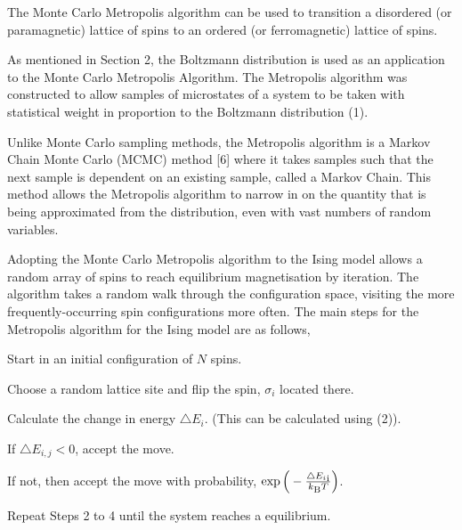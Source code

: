\documentclass[a4paper]{article}
\begin{document}
The Monte Carlo Metropolis algorithm \cite{5} can be used to transition a disordered (or paramagnetic) lattice of spins to an ordered (or ferromagnetic) lattice of spins.

As mentioned in Section 2, the Boltzmann distribution is used as an application to the Monte Carlo Metropolis Algorithm. The Metropolis algorithm was constructed to allow samples of microstates of a system to be taken with statistical weight in proportion to the Boltzmann distribution (1). 

Unlike Monte Carlo sampling methods, the Metropolis algorithm is a Markov Chain Monte Carlo (MCMC) method [6] where it takes samples such that the next sample is dependent on an existing sample, called a Markov Chain. This method allows the Metropolis algorithm to narrow in on the quantity that is being approximated from the distribution, even with vast numbers of random variables. 


Adopting the Monte Carlo Metropolis algorithm to the Ising model \cite{6} allows a random array of spins to reach equilibrium magnetisation by iteration. The algorithm takes a random walk through the configuration space, visiting the more frequently-occurring spin configurations more often. The main steps for the Metropolis algorithm for the Ising model \cite{6} are as follows, 

\begin{description}[font=$\bullet$~\normalfont\scshape]
\item [Step 1] Start in an initial configuration of $N$ spins.
\item [Step 2] Choose a random lattice site and flip the spin, $\sigma_{i}$ located there.
\item [Step 3] Calculate the change in energy $\triangle{E_{i}}$. (This can be calculated using (2)).
\item [Step 4 (i)] If $\triangle{E_{i,j}} < 0$, accept the move.
\item [Step 4 (ii)] If not, then accept the move with probability, $\exp \Big( - \frac{\triangle{E_{i}}\textsubscript{i}}{k\textsubscript{B} T}\Big)$.
\item [Step 5] Repeat Steps 2 to 4 until the system reaches a equilibrium.
\end{description}
\end{document}
